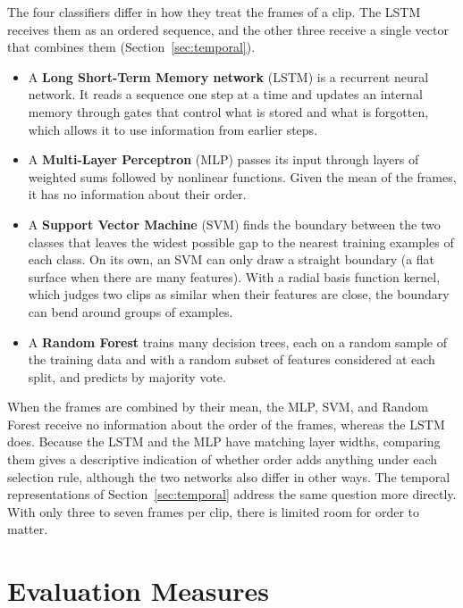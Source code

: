 The four classifiers differ in how they treat the frames of a clip. The LSTM receives them as an ordered sequence, and the other three receive a single vector that combines them (Section~\ref{sec:temporal}).

\begin{itemize}
   \item A \textbf{Long Short-Term Memory network} (LSTM) \cite{hochreiter1997} is a recurrent neural network. It reads a sequence one step at a time and updates an internal memory through gates that control what is stored and what is forgotten, which allows it to use information from earlier steps.
   \item A \textbf{Multi-Layer Perceptron} (MLP) passes its input through layers of weighted sums followed by nonlinear functions. Given the mean of the frames, it has no information about their order.
   \item A \textbf{Support Vector Machine} (SVM) \cite{cortes1995} finds the boundary between the two classes that leaves the widest possible gap to the nearest training examples of each class. On its own, an SVM can only draw a straight boundary (a flat surface when there are many features). With a radial basis function kernel, which judges two clips as similar when their features are close, the boundary can bend around groups of examples.
   \item A \textbf{Random Forest} \cite{breiman2001} trains many decision trees, each on a random sample of the training data and with a random subset of features considered at each split, and predicts by majority vote.
\end{itemize}

When the frames are combined by their mean, the MLP, SVM, and Random Forest receive no information about the order of the frames, whereas the LSTM does. Because the LSTM and the MLP have matching layer widths, comparing them gives a descriptive indication of whether order adds anything under each selection rule, although the two networks also differ in other ways. The temporal representations of Section~\ref{sec:temporal} address the same question more directly. With only three to seven frames per clip, there is limited room for order to matter.



\section{Evaluation Measures}
\label{sec:measures}

